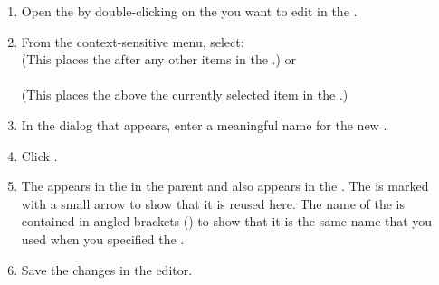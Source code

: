 \begin{enumerate}
\item Open the \gdtestcaseeditor{} by double-clicking on the \gdcase{} you want to edit in the \gdtestcasebrowser{}. 
\item From the context-sensitive menu, select:
\\
(This places the \gdcase{} after any other items in the \gdtestcaseeditor{}.)
or\\
\\
(This places the \gdcase{} above the currently selected item in the \gdtestcaseeditor{}.)

\item In the dialog that appears, enter a meaningful name for the new \gdcase{}. 
\item Click . 
\item The \gdcase{} appears in the \gdtestcaseeditor{} in the parent  \gdcase{} and also appears in the \gdtestcasebrowser{}.  The \gdcase{} is  marked with a small arrow to show that it is  reused here. The name of the \gdcase{} is contained in angled brackets (\bxshell{< >}) to show that it is the same name that you used when you specified the \gdcase{}. 
\item Save the changes in the editor.
\end{enumerate}

